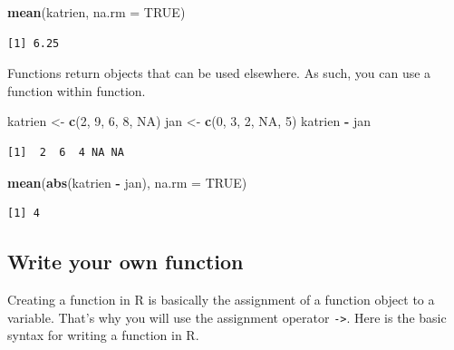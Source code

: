 \documentclass[
]{book}
\newenvironment{Shaded}{\begin{snugshade}}{\end{snugshade}}
\newcommand{\DataTypeTok}[1]{\textcolor[rgb]{0.13,0.29,0.53}{#1}}
\newcommand{\DecValTok}[1]{\textcolor[rgb]{0.00,0.00,0.81}{#1}}
\newcommand{\KeywordTok}[1]{\textcolor[rgb]{0.13,0.29,0.53}{\textbf{#1}}}
\newcommand{\NormalTok}[1]{#1}
\newcommand{\OperatorTok}[1]{\textcolor[rgb]{0.81,0.36,0.00}{\textbf{#1}}}
\newcommand{\OtherTok}[1]{\textcolor[rgb]{0.56,0.35,0.01}{#1}}
\newcommand{\StringTok}[1]{\textcolor[rgb]{0.31,0.60,0.02}{#1}}
\begin{document}
\begin{Shaded}
\begin{Highlighting}[]
\KeywordTok{mean}\NormalTok{(katrien, }\DataTypeTok{na.rm =} \OtherTok{TRUE}\NormalTok{)}
\end{Highlighting}
\end{Shaded}

\begin{verbatim}
[1] 6.25
\end{verbatim}

Functions return objects that can be used elsewhere. As such, you can use a function within function.

\begin{Shaded}
\begin{Highlighting}[]
\NormalTok{katrien <-}\StringTok{ }\KeywordTok{c}\NormalTok{(}\DecValTok{2}\NormalTok{, }\DecValTok{9}\NormalTok{, }\DecValTok{6}\NormalTok{, }\DecValTok{8}\NormalTok{, }\OtherTok{NA}\NormalTok{)}
\NormalTok{jan <-}\StringTok{ }\KeywordTok{c}\NormalTok{(}\DecValTok{0}\NormalTok{, }\DecValTok{3}\NormalTok{, }\DecValTok{2}\NormalTok{, }\OtherTok{NA}\NormalTok{, }\DecValTok{5}\NormalTok{)}
\NormalTok{katrien }\OperatorTok{-}\StringTok{ }\NormalTok{jan}
\end{Highlighting}
\end{Shaded}

\begin{verbatim}
[1]  2  6  4 NA NA
\end{verbatim}

\begin{Shaded}
\begin{Highlighting}[]
\KeywordTok{mean}\NormalTok{(}\KeywordTok{abs}\NormalTok{(katrien }\OperatorTok{-}\StringTok{ }\NormalTok{jan), }\DataTypeTok{na.rm =} \OtherTok{TRUE}\NormalTok{)}
\end{Highlighting}
\end{Shaded}

\begin{verbatim}
[1] 4
\end{verbatim}

\hypertarget{write-your-own-function}{%
\subsection{Write your own function}\label{write-your-own-function}}

Creating a function in R is basically the assignment of a function object to a variable. That's why you will use the assignment operator \texttt{-\textgreater{}}. Here is the basic syntax for writing a function in R.
\end{document}
